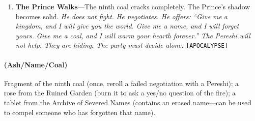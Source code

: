 \begin{enumerate}
  \hfill \textit{She has not aged. Her eyes are coals. She says: ``The seal is failing. I need a new name to bind.'' She looks at the party. She asks: ``Who volunteers?'' Refusal will not be accepted. The party must offer a false name, a dead name, or a memory of a name. The flame-keeper will know if it is false.} \texttt{[LEGEND]} \texttt{[FEAR]}
\item[A] \textbf{The Prince Walks}---The ninth coal cracks completely. The Prince's shadow becomes solid.
  \hfill \textit{He does not fight. He negotiates. He offers: ``Give me a kingdom, and I will give you the world. Give me a name, and I will forget yours. Give me a coal, and I will warm your hearth forever.'' The Pereshi will not help. They are hiding. The party must decide alone.} \texttt{[APOCALYPSE]}
\end{enumerate}

\paragraph*{(Ash/Name/Coal)} Fragment of the ninth coal (once, reroll a failed negotiation with a Pereshi); a rose from the Ruined Garden (burn it to ask a yes/no question of the fire); a tablet from the Archive of Severed Names (contains an erased name---can be used to compel someone who has forgotten that name).

